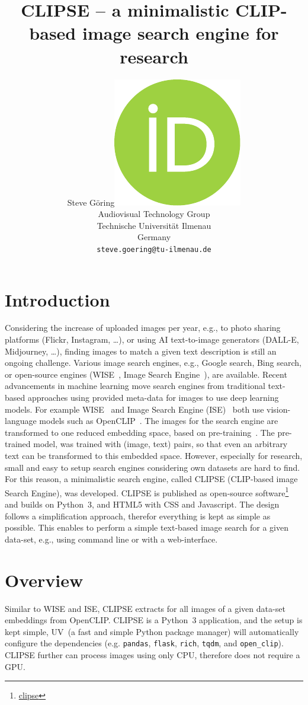 \documentclass{article}
\title{CLIPSE -- a minimalistic CLIP-based image search engine for research}
\author{ Steve Göring\hspace{1mm}\href{https://orcid.org/0000-0001-6810-6969}{\includegraphics[scale=0.06]{orcid.pdf}}\\
    Audiovisual Technology Group\\
    Technische Universität Ilmenau\\
    Germany \\
    \texttt{steve.goering@tu-ilmenau.de} \\
}
\begin{document}
\maketitle

\begin{abstract}

\end{abstract}




\section{Introduction}
Considering the increase of uploaded images per year, e.g., to photo sharing platforms (Flickr, Instagram, \ldots), or using AI text-to-image generators (DALL-E, Midjourney, \ldots), finding images to match a given text description is still an ongoing challenge.
Various image search engines, e.g., Google search, Bing search, or open-source engines (WISE~\cite{wise}, Image Search Engine~\cite{ise}), are available.
Recent advancements in machine learning move search engines from traditional text-based approaches using provided meta-data for images to use deep learning models.
For example WISE~\cite{wise} and Image Search Engine (ISE)~\cite{ise} both use vision-language models such as OpenCLIP~\cite{ilharco_gabriel_2021_5143773,cherti2023reproducible,Radford2021LearningTV,schuhmann2022laionb}.
The images for the search engine are transformed to one reduced embedding space, based on pre-training~\cite{Radford2021LearningTV}.
The pre-trained model, was trained with (image, text) pairs, so that even an arbitrary text can be transformed to this embedded space.
However, especially for research, small and easy to setup search engines considering own datasets are hard to find.
For this reason, a minimalistic search engine, called CLIPSE (CLIP-based image Search Engine), was developed.
CLIPSE is published as open-source software\footnote{\url{clipse}} and builds on Python~3, and HTML5 with CSS and Javascript.
The design follows a simplification approach, therefor everything is kept as simple as possible.
This enables to perform a simple text-based image search for a given data-set, e.g., using command line or with a web-interface.



\section{Overview}
Similar to WISE and ISE, CLIPSE extracts for all images of a given data-set embeddings from OpenCLIP.
CLIPSE is a Python~3 application, and the setup is kept simple, UV~\cite{uv}(a fast and simple Python package manager) will automatically configure the dependencies (e.g. \texttt{pandas}, \texttt{flask}, \texttt{rich}, \texttt{tqdm}, and \texttt{open\_clip}).
CLIPSE further can process images using only CPU, therefore does not require a GPU.
\end{document}
